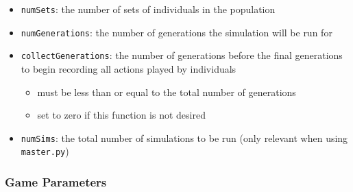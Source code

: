 \documentclass[11pt,twoside]{report}
\begin{document}
\begin{itemize}
\item \texttt{numSets}: the number of sets of individuals in the population 
\item \texttt{numGenerations}: the number of generations the simulation will be run for 
\item \texttt{collectGenerations}: the number of generations before the final generations to begin recording all actions played by individuals
\begin{itemize}
\item must be less than or equal to the total number of generations
\item set to zero if this function is not desired
\end{itemize}
\item \texttt{numSims}: the total number of simulations to be run (only relevant when using \texttt{master.py})
\end{itemize}

\subsubsection*{Game Parameters}
\end{document}
